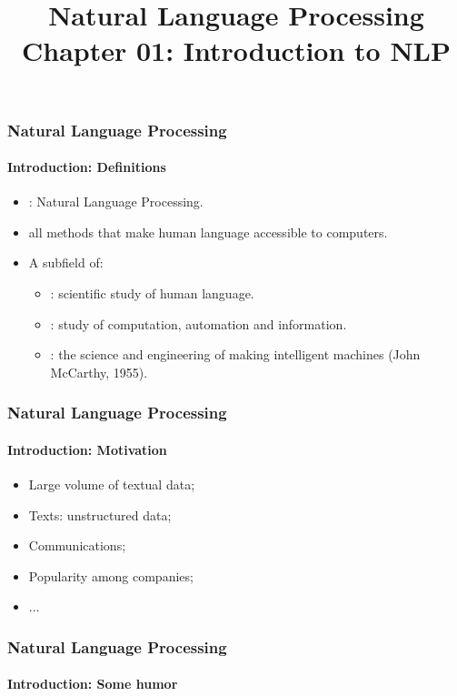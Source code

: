 \documentclass[xcolor=table]{beamer}
\title[ESI - NLP: 01- Introduction]%
{Natural Language Processing\\Chapter 01: Introduction to NLP}
\begin{document}
	
\begin{frame}
\frametitle{Natural Language Processing}
\framesubtitle{Introduction: Definitions}

\begin{itemize}
	\item {}: Natural Language Processing.
	\item all methods that make human language accessible to computers.
\end{itemize}
\begin{minipage}{0.78\textwidth}
\begin{itemize}
	\item A subfield of:
	\begin{itemize}
		\item {}: scientific study of human language.
		\item {}: study of computation, automation and information.
		\item {}: the science and engineering of
		making intelligent machines (John McCarthy, 1955).
	\end{itemize}
\end{itemize}
\end{minipage}
\begin{minipage}{0.20\textwidth}
\end{minipage}
\end{frame}

\begin{frame}
\frametitle{Natural Language Processing}
\framesubtitle{Introduction: Motivation}

\begin{itemize}
	\item Large volume of textual data;
	
	\item Texts: unstructured data;
	
	\item Communications;
	
	\item Popularity among companies;
	
	\item ...
\end{itemize}

\end{frame}

\begin{frame}
\frametitle{Natural Language Processing}
\framesubtitle{Introduction: Some humor}

\begin{center}
\end{center}

\end{frame}
\end{document}
